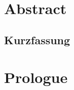%
\begingroup%
	\renewcommand*{\chapterpagestyle}{plain}%
	\pagestyle{plain}%
	\DenKrKOMAHookToCGroup%
	\tableofcontentsDenKr%
	\cleardoublepage%
\endgroup%
%
%
\noindent%
\settoheight{\tmpheight}{\begin{minipage}{\textwidth}\end{minipage}}%
\setlength\tmpheight{\textheight-\tmpheight}%
\setlength{}%
\setlength\tmpheight{0.75\tmpheight}%
\vspace*{\tmpheight}\\%
%
\cleardoublepage%
%
%
%
\headingOpenTempAny%
\chapter{Abstract}%
\headingOpenTempRestore%
%
\headingOpenTempAny%
\begin{german}%
\chapter{Kurzfassung}%
\headingOpenTempRestore%
%
\end{german}%
%
\providecommand{\DenKrLayout}{}%
\expandafter\ifstrequal\expandafter{\DenKrLayout}{scrbook_print}{}{%
\headingOpenTempAny%
\chapter{Prologue}%
\headingOpenTempRestore%
%
}%
%